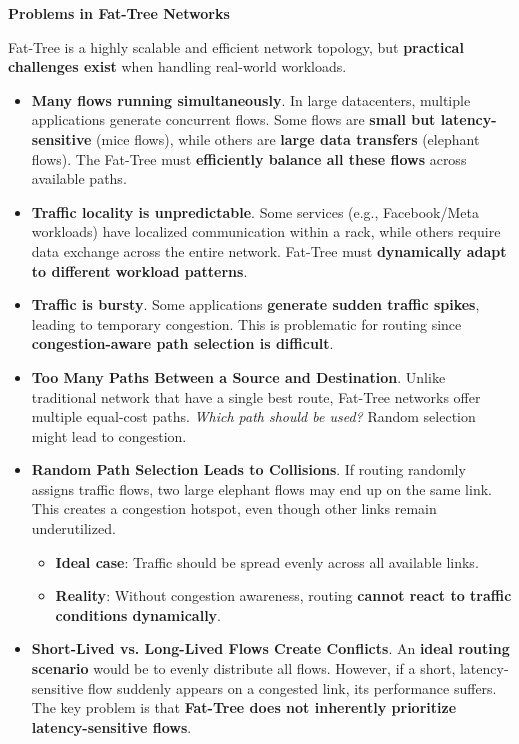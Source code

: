 \highspace
\begin{flushleft}
    \textcolor{Red2}{ \textbf{Problems in Fat-Tree Networks}}
\end{flushleft}
Fat-Tree is a highly scalable and efficient network topology, but \textbf{practical challenges exist} when handling real-world workloads.
\begin{itemize}
    \item \textcolor{Red2}{\textbf{Many flows running simultaneously}}. In large datacenters, multiple applications generate concurrent flows. Some flows are \textbf{small but latency-sensitive} (mice flows), while others are \textbf{large data transfers} (elephant flows). The Fat-Tree must \textbf{efficiently balance all these flows} across available paths.

    \item \textcolor{Red2}{\textbf{Traffic locality is unpredictable}}. Some services (e.g., Facebook/Meta workloads) have localized communication within a rack, while others require data exchange across the entire network. Fat-Tree must \textbf{dynamically adapt to different workload patterns}.

    \item \textcolor{Red2}{\textbf{Traffic is bursty}}. Some applications \textbf{generate sudden traffic spikes}, leading to temporary congestion. This is problematic for routing since \textbf{congestion-aware path selection is difficult}.

    \item \textcolor{Red2}{\textbf{Too Many Paths Between a Source and Destination}}. Unlike traditional network that have a single best route, Fat-Tree networks offer multiple equal-cost paths. \emph{Which path should be used?} Random selection might lead to congestion.

    \item \textcolor{Red2}{\textbf{Random Path Selection Leads to Collisions}}. If routing randomly assigns traffic flows, two large elephant flows may end up on the same link. This creates a congestion hotspot, even though other links remain underutilized.
    \begin{itemize}
        \item \textcolor{Green3}{\textbf{Ideal case}}: Traffic should be spread evenly across all available links.
        \item \textcolor{Red2}{\textbf{Reality}}: Without congestion awareness, routing \textbf{cannot react to traffic conditions dynamically}.
    \end{itemize}

    \item \textcolor{Red2}{\textbf{Short-Lived vs. Long-Lived Flows Create Conflicts}}. An \textbf{ideal routing scenario} would be to evenly distribute all flows. However, if a short, latency-sensitive flow suddenly appears on a congested link, its performance suffers. The key problem is that \textbf{Fat-Tree does not inherently prioritize latency-sensitive flows}.
\end{itemize}


